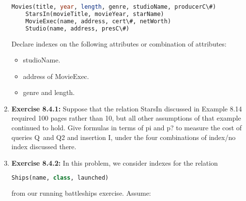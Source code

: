 \documentclass[12pt]{article}
\begin{document}
\begin{enumerate}[1.]
    \bigskip

    \begin{lstlisting}[language=SQL]
    Movies(title, year, length, genre, studioName, producerC\#)
    StarsIn(movieTitle, movieYear, starName)
    MovieExec(name, address, cert\#, netWorth)
    Studio(name, address, presC\#)
    \end{lstlisting}

    \bigskip

    Declare indexes on the following attributes or combination of attributes:

    \bigskip

    \begin{itemize}
        \item studioName.
        \item address of MovieExec.
        \item genre and length.
    \end{itemize}

    \item \textbf{Exercise 8.4.1:} Suppose that the relation StarsIn discussed in Example 8.14
    required 100 pages rather than 10, but all other assumptions of that example
    continued to hold. Give formulas in terms of pi and p? to measure the cost of
    queries Q\ and Q2 and insertion I, under the four combinations of index/no index
    discussed there.

    \item \textbf{Exercise 8.4.2:} In this problem, we consider indexes for the relation

    \bigskip

    \begin{lstlisting}[language=SQL]
    Ships(name, class, launched)
    \end{lstlisting}

    \bigskip

    from our running battleships exercise. Assume:

    \bigskip


\end{enumerate}
\end{document}
